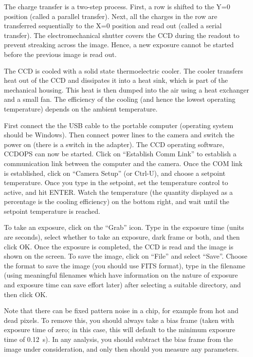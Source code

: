 \documentclass[a4paper,12pt]{article}
\begin{document}
The charge transfer is a two-step process. First, a row is shifted to the Y=0 position (called a parallel transfer). Next, all the charges in the row are transferred sequentially to the X=0 position and read out (called a serial transfer). The electromechanical shutter covers the CCD during the readout to prevent streaking across the image. Hence, a new exposure cannot be started before the previous image is read out.

The CCD is cooled with a solid state thermoelectric cooler. The cooler transfers heat out of the CCD and dissipates it into a heat sink, which is part of the mechanical housing. This heat is then dumped into the air using a heat exchanger and a small fan. The efficiency of the cooling (and hence the lowest operating temperature) depends on the ambient temperature.



First connect the the USB cable to the portable computer (operating system should be Windows). Then connect power lines to the camera and switch the power on (there is a switch in the adapter). The CCD operating software, CCDOPS can now be started. Click on ``Establish Comm Link'' to establish a communication link between the computer and the camera. Once the COM link is established, click on ``Camera Setup'' (or Ctrl-U), and choose a setpoint temperature. Once you type in the setpoint, set the temperature control to active, and hit ENTER. Watch the temperature (the quantity displayed as a percentage is the cooling efficiency) on the bottom right, and wait until the setpoint temperature is reached.

To take an exposure, click on the ``Grab'' icon. Type in the exposure time (units are seconds), select whether to take an exposure, dark frame or both, and then click OK. Once the exposure is completed, the CCD is read and the image is shown on the screen. To save the image, click on ``File'' and select ``Save''. Choose the format to save the image (you should use FITS format), type in the filename (using meaningful filenames which have information on the nature of exposure and exposure time can save effort later) after selecting a suitable directory, and then click OK.


Note that there can be fixed pattern noise in a chip, for example from hot and dead pixels. To remove this, you should always take a bias frame (taken with exposure time of zero; in this case, this will default to the minimum exposure time of 0.12~s). In any analysis, you should subtract the bias frame from the image under consideration, and only then should you measure any parameters.
\end{document}
